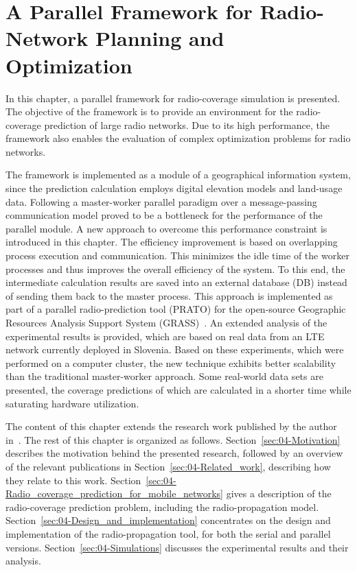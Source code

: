 
\chapter{A Parallel Framework for Radio-Network Planning and Optimization
\label{chap:04-Framework-design-and-implementation}}


In this chapter, a parallel framework for radio-coverage simulation
is presented. The objective of the framework is to provide an environment
for the radio-coverage prediction of large radio networks. Due to
its high performance, the framework also enables the evaluation of
complex optimization problems for radio networks. 

The framework is implemented as a module of a geographical information
system, since the prediction calculation employs digital elevation
models and land-usage data. Following a master-worker parallel paradigm
over a message-passing communication model proved to be a bottleneck
for the performance of the parallel module. A new approach to overcome
this performance constraint is introduced in this chapter. The efficiency
improvement is based on overlapping process execution and communication.
This minimizes the idle time of the worker processes and thus improves
the overall efficiency of the system. To this end, the intermediate
calculation results are saved into an external database (DB)
instead of sending them back to the master process. This approach
is implemented as part of a parallel radio-prediction tool (PRATO)
for the open-source Geographic Resources Analysis Support System (GRASS)~\cite{Neteler_Open_source_GIS_a_GRASS_GIS_approach}.
An extended analysis of the experimental results is provided, which
are based on real data from an LTE network currently deployed in Slovenia.
Based on these experiments, which were performed on a computer cluster,
the new technique exhibits better scalability than the traditional
master-worker approach. Some real-world data sets are presented, the
coverage predictions of which are calculated in a shorter time while
saturating hardware utilization.

The content of this chapter extends the research work published by
the author in~\cite{Benedicic-A_GRASS_GIS_parallel_module_for_radio-propagation_predictions:2013}.
The rest of this chapter is organized as follows. Section~\ref{sec:04-Motivation}
describes the motivation behind the presented research, followed by
an overview of the relevant publications in Section~\ref{sec:04-Related_work},
describing how they relate to this work. Section~\ref{sec:04-Radio_coverage_prediction_for_mobile_networks}
gives a description of the radio-coverage prediction problem, including
the radio-propagation model. Section~\ref{sec:04-Design_and_implementation}
concentrates on the design and implementation of the radio-propagation
tool, for both the serial and parallel versions. Section~\ref{sec:04-Simulations}
discusses the experimental results and their analysis.


